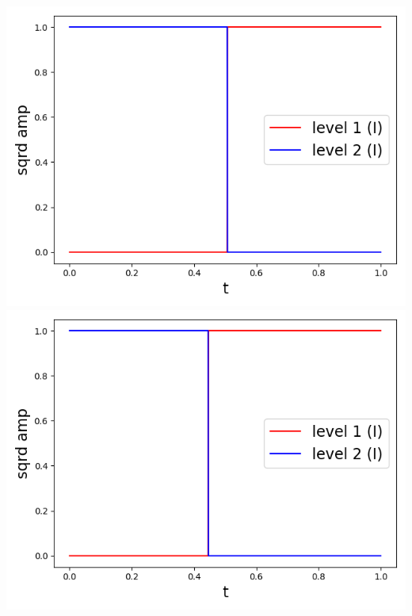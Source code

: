 \documentclass[11pt, oneside]{book}
\theoremstyle{break}
\theoremstyle{break}
\begin{document}
\begin{center}
\includegraphics[scale=0.39]{542HW2/I/4I_single.png}\qquad
\includegraphics[scale=0.39]{542HW2/I/5I_single.png}
\end{center}
\end{document}
